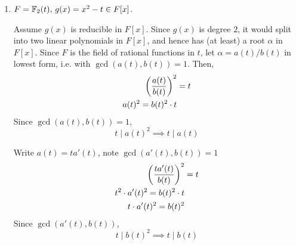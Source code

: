 \documentclass[12pt]{article}
\begin{document}
\begin{solution}
\begin{enumerate}
\begin{enumerate}
        ($\implies$) 

        Assume $g(x)$ is irreducible over $F$. 
        We know that $g(x)$ splits over $K = F(\sqrt{(\Delta(g))})$. If $g(x)$ is irreducible over $F$, then $\sqrt{(\Delta(g))} \notin F$, i.e. $\Delta(g)$ is not a square in $F$. 

        ($\impliedby$) 

        Assume $\Delta(g)$ is not a square in $F$, i.e. $\sqrt{(\Delta(g))}  \notin F$, and thus 
        \[[K:F] = [F(\alpha): F] = [F(\sqrt{\Delta(g)}):F] = 2\]
        Therefore the minimal polynomial of $\alpha$ over $F$ has degree $2$, so $g(x)$ is irreducible over $F$.

        \item To show that $g(x)$ is a square in $F[x]$ if and only if $\Delta(g) = 0$. 

        ($\implies$) 

        Assume $g(x)$ is a square in $F[x]$. Then, for some $f(x) \in F[x]$ and some $\alpha$, 
        \[g(x) = (f(x))^2 = (x - \alpha)^2\]
        Then, $\Delta(g) = (\alpha - \alpha)^2 = 0^2 = 0$. 

        ($\impliedby$) 

        Assume $\Delta(g) = 0$. Since $g(x)$ is a quadratic, this means it has a single root with multiplicity 2. That is, $g(x) = (x- \alpha)(x-\alpha)$ for some $\alpha \in F[x]$. That is, $g(x)$ is a square in $F[x]$. 
    
        \end{enumerate}

        \item $F = \mathbb F_2(t), \, g(x) = x^2 - t \in F[x]$. 
        
        Assume $g(x)$ is reducible in $F[x]$. Since $g(x)$ is degree $2$, it would split into two linear polynomials in $F[x]$, and hence has (at least) a root $\alpha$ in $F[x]$. Since $F$ is the field of rational functions in $t$, let $\alpha = a(t)/b(t)$ in lowest form, i.e. with $\gcd(a(t), b(t)) =1$. Then, 
        \begin{align*}
            \left(\frac{a(t)}{b(t)}\right)^2 &= t \\ 
            a(t)^2 = b(t)^2 \cdot t \\ 
        \end{align*}
        Since $\gcd(a(t), b(t))=1$, 
            \[t \mid a(t)^2 \implies t \mid a(t)\]

        Write $a(t) = ta'(t)$, note $\gcd(a'(t), b(t)) =1$
         \begin{align*}
            \left(\frac{ta'(t)}{b(t)}\right)^2 &= t \\ 
            t^2 \cdot a'(t)^2 = b(t)^2 \cdot t \\ 
            t \cdot a'(t)^2 = b(t)^2 \\ 
        \end{align*}
        Since $\gcd(a'(t), b(t))$, 
            \[t \mid b(t)^2 \implies t \mid b(t)\]


\end{enumerate}
\end{solution}
\end{document}

